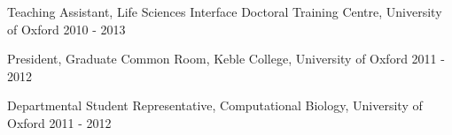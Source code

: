 

\begin{cvsubentries}

    \cvsubentry
      {} %
      {Teaching Assistant, Life Sciences Interface Doctoral Training Centre, University of Oxford} %
      {2010 - 2013} %
      {}
  
    \cvsubentry
      {}
      {President, Graduate Common Room, Keble College, University of Oxford} %
      {2011 - 2012} %
      {} %
  
    \cvsubentry
      {}
      {Departmental Student Representative, Computational Biology, University of Oxford} %
      {2011 - 2012} %
      {} %
  
  
  \end{cvsubentries}